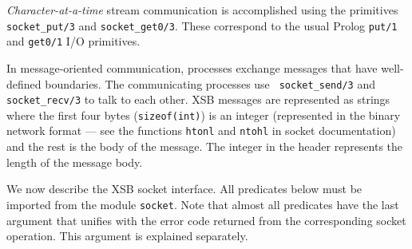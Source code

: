 \emph{Character-at-a-time} stream communication is accomplished using
the primitives {\tt socket\_put/3} and {\tt socket\_get0/3}. These
correspond to the usual Prolog {\tt put/1} and {\tt get0/1} I/O primitives.

In message-oriented communication, processes exchange messages that have
well-defined boundaries. The communicating processes use {\tt
  socket\_send/3} and {\tt socket\_recv/3} to talk to each other.
XSB messages are represented as strings where the first four bytes
({\tt sizeof(int)}) is an integer (represented in the binary network format
--- see the functions {\tt htonl} and {\tt ntohl} in socket documentation)
and the rest is the body of the message. The integer in the header
represents the length of the message body.

We now describe the XSB socket interface.  All predicates below must be
imported from the module {\tt socket}. Note that almost all predicates have
the last argument that unifies with the error code returned from the
corresponding socket operation. This argument is explained separately.

